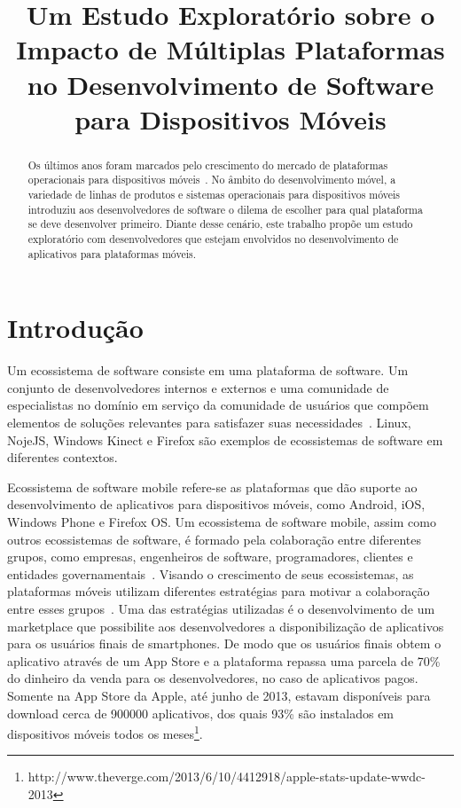 \documentclass[conference]{IEEEtran}
\begin{document}
\title{Um Estudo Exploratório sobre o Impacto de Múltiplas Plataformas no Desenvolvimento de Software para Dispositivos Móveis}

\author{
}

\maketitle


\begin{abstract}
Os últimos anos foram marcados pelo crescimento do mercado de plataformas operacionais para dispositivos móveis~\cite{Butler2011}. No âmbito do desenvolvimento móvel, a variedade de linhas de produtos e sistemas operacionais para dispositivos móveis introduziu aos desenvolvedores de software o dilema de escolher para qual plataforma se deve desenvolver primeiro. Diante desse cenário, este trabalho propõe um estudo exploratório com desenvolvedores que estejam envolvidos no desenvolvimento de aplicativos para plataformas móveis.
\end{abstract}

\IEEEpeerreviewmaketitle



\section{Introdução}

Um ecossistema de software consiste em uma plataforma de software. Um conjunto de desenvolvedores internos e externos e uma comunidade de especialistas no domínio em serviço da comunidade de usuários que compõem elementos de soluções relevantes para satisfazer suas necessidades~\cite{Bosch201067}. Linux, NojeJS, Windows Kinect e Firefox são exemplos de ecossistemas de software em diferentes contextos. 

Ecossistema de software mobile refere-se as plataformas que dão suporte ao desenvolvimento de aplicativos para dispositivos móveis, como Android, iOS, Windows Phone e Firefox OS. Um ecossistema de software mobile, assim como outros ecossistemas de software, é formado pela colaboração entre diferentes grupos, como empresas, engenheiros de software, programadores, clientes e entidades governamentais~\cite{Jansen2013,Scacchi2012}. Visando o crescimento de seus ecossistemas, as plataformas móveis utilizam diferentes estratégias para motivar a colaboração entre esses grupos~\cite{Corral2014}. Uma das estratégias utilizadas é o desenvolvimento de um marketplace que possibilite aos desenvolvedores a disponibilização de aplicativos para os usuários finais de smartphones. De modo que os usuários finais obtem o aplicativo através de um App Store e a plataforma repassa uma parcela de 70\% do dinheiro da venda para os desenvolvedores, no caso de aplicativos pagos. Somente na App Store da Apple, até junho de 2013, estavam disponíveis para download cerca de 900000 aplicativos, dos quais 93\% são instalados em dispositivos móveis todos os meses\footnote{http://www.theverge.com/2013/6/10/4412918/apple-stats-update-wwdc-2013}. 
  
\end{document}
